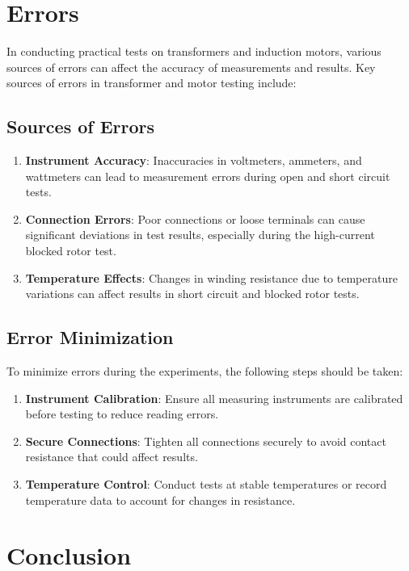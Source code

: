 \documentclass[12pt,a4paper]{report}
\begin{document}
\chapter{Errors}

In conducting practical tests on transformers and induction motors, various sources of errors can affect the accuracy of measurements and results. Key sources of errors in transformer and motor testing include:

\section{Sources of Errors}

\begin{enumerate}
    \item \textbf{Instrument Accuracy}: Inaccuracies in voltmeters, ammeters, and wattmeters can lead to measurement errors during open and short circuit tests.
    \item \textbf{Connection Errors}: Poor connections or loose terminals can cause significant deviations in test results, especially during the high-current blocked rotor test.
    \item \textbf{Temperature Effects}: Changes in winding resistance due to temperature variations can affect results in short circuit and blocked rotor tests.
\end{enumerate}

\section{Error Minimization}

To minimize errors during the experiments, the following steps should be taken:

\begin{enumerate}
    \item \textbf{Instrument Calibration}: Ensure all measuring instruments are calibrated before testing to reduce reading errors.
    \item \textbf{Secure Connections}: Tighten all connections securely to avoid contact resistance that could affect results.
    \item \textbf{Temperature Control}: Conduct tests at stable temperatures or record temperature data to account for changes in resistance.
\end{enumerate}

\chapter{Conclusion}
\end{document}
